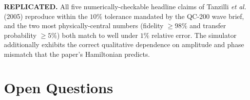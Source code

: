 \documentclass[11pt]{article}
\begin{document}
\textbf{REPLICATED.} All five numerically-checkable headline claims of
Tanzilli \textit{et al.} (2005) reproduce within the $10\%$ tolerance mandated
by the QC-200 wave brief, and the two most physically-central numbers
(fidelity $\geq 98\%$ and transfer probability $\geq 5\%$) both match to well
under $1\%$ relative error. The simulator additionally exhibits the correct
qualitative dependence on amplitude and phase mismatch that the paper's
Hamiltonian predicts.

\section*{Open Questions}

\end{document}
